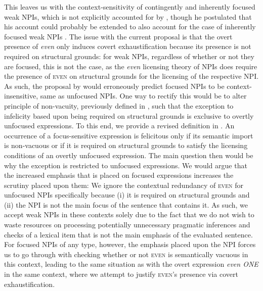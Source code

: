 This leaves us with the context-sensitivity of contingently and inherently focused weak NPIs, which is not explicitly accounted for by \textcite{Crnic2014-dogma}, though he postulated that his account could probably be extended to also account for the case of inherently focused weak NPIs \parencite[p.~143]{Crnic2014-dogma}. The issue with the current proposal is that the overt presence of \textit{even} only induces covert exhaustification because its presence is not required on structural grounds: for weak NPIs, regardless of whether or not they are focused, this is not the case, as the \textit{even} licensing theory of NPIs does require the presence of {\scshape even} on structural grounds for the licensing of the respective NPI. As such, the proposal by \textcite{Crnic2014-dogma} would erroneously predict focused NPIs to be context-insensitive, same as unfocused NPIs. One way to rectify this would be to alter  principle of non-vacuity, previously defined in , such that the exception to infelicity based upon being required on structural grounds is exclusive to overtly unfocused expressions. To this end, we provide a revised definition in .
\ex
{}
An occurrence of a focus-sensitive expression is felicitous only if its semantic import is non-vacuous or if it is required on structural grounds to satisfy the licensing conditions of an overtly unfocused expression.
\xe
The main question then would be why the exception is restricted to unfocused expressions. We would argue that the increased emphasis that is placed on focused expressions increases the scrutiny placed upon them: We ignore the contextual redundancy of {\scshape even} for unfocused NPIs specifically because (i) it is required on structural grounds and (ii) the NPI is not the main focus of the sentence that contains it. As such, we accept weak NPIs in these contexts solely due to the fact that we do not wish to waste resources on processing potentially unnecessary pragmatic inferences and checks of a lexical item that is not the main emphasis of the evaluated sentence. For focused NPIs of any type, however, the emphasis placed upon the NPI forces us to go through with checking whether or not {\scshape even} is semantically vacuous in this context, leading to the same situation as with the overt expression \textit{even \MakeUppercase{one}} in the same context, where we attempt to justify {\scshape even}'s presence via covert exhaustification. %

